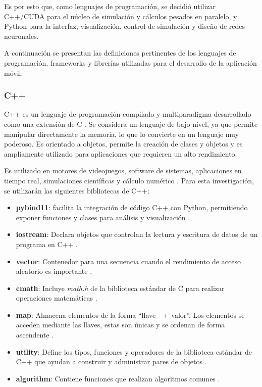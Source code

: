 Es por esto que, como lenguajes de programación, se decidió utilizar C++/CUDA para el núcleo de simulación y cálculos pesados en paralelo, y Python para la interfaz, visualización, control de simulación y diseño de redes neuronales. 

A continuación se presentan las definiciones pertinentes de los lenguajes de programación, frameworks y librerías utilizadas para el desarrollo de la aplicación móvil.

\subsubsection{C++}

C++ es un lenguaje de programación compilado y multiparadigma desarrollado como una extensión de C \cite{c_1}. Se considera un lenguaje de bajo nivel, ya que permite manipular directamente la memoria, lo que lo convierte en un lenguaje muy poderoso. Es orientado a objetos, permite la creación de clases y objetos y es ampliamente utilizado para aplicaciones que requieren un alto rendimiento.

Es utilizado en motores de videojuegos, software de sistemas, aplicaciones en tiempo real, simulaciones científicas y cálculo numérico \cite{c_2}. Para esta investigación, se utilizarán las siguientes bibliotecas de C++:

\begin{itemize}
	\item \textbf{pybind11}: facilita la integración de código C++ con Python, permitiendo exponer funciones y clases para análisis y visualización \cite{pybind}.
	
	\item \textbf{iostream}: Declara objetos que controlan la lectura y escritura de datos de un programa en C++ \cite{iostream}.
	
	\item \textbf{vector}: Contenedor para una secuencia cuando el rendimiento de acceso aleatorio es importante \cite{vector}.
	
	\item \textbf{cmath}: Incluye \textit{math.h} de la biblioteca estándar de C para realizar operaciones matemáticas \cite{cmath}.
	
	\item \textbf{map}: Almacena elementos de la forma ``llave $\to$ valor''. Los elementos se acceden mediante las llaves, estas son únicas y se ordenan de forma ascendente \cite{map}.
	
	\item \textbf{utility}: Define los tipos, funciones y operadores de la biblioteca estándar de C++ que ayudan a construir y administrar pares de objetos \cite{utility}.
	
	\item \textbf{algorithm}: Contiene funciones que realizan algoritmos comunes \cite{algorithm}.
\end{itemize}


